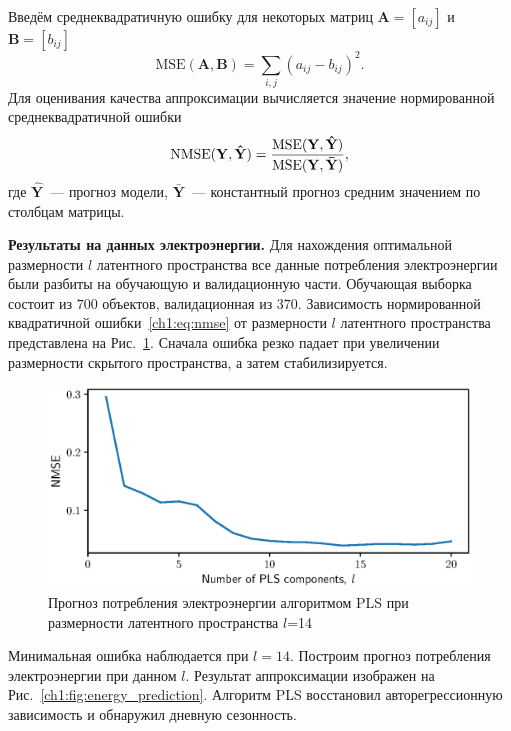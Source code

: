 Введём среднеквадратичную ошибку для некоторых матриц $\mathbf{A} = [a_{ij}]$ и $\mathbf{B} = [b_{ij}]$
\[
\text{MSE} (\mathbf{A}, \mathbf{B}) = \sum_{i,j} (a_{ij} - b_{ij})^2.
\]
Для оценивания качества аппроксимации вычисляется значение нормированной среднеквадратичной ошибки
\begin{equation}
\text{NMSE}(\mathbf{Y},  \mathbf{\hat{Y}}) = \frac{\text{MSE} (\mathbf{Y}, \mathbf{\hat{Y}})}{\text{MSE} (\mathbf{Y}, \mathbf{\bar{Y}})},
\label{ch1:eq:nmse}
\end{equation}
где $\mathbf{\hat{Y}}$~--- прогноз модели, $\mathbf{\bar{Y}}$~--- константный прогноз средним значением по столбцам матрицы.

\textbf{Результаты на данных электроэнергии.}
Для нахождения оптимальной размерности $l$ латентного пространства все данные потребления электроэнергии были разбиты на обучающую и валидационную части. 
Обучающая выборка состоит из $700$ объектов, валидационная из $370$. Зависимость нормированной квадратичной ошибки~\eqref{ch1:eq:nmse} от размерности $l$ латентного пространства представлена на Рис.~\ref{ch1:fig:energy_n_comp}. 
Сначала ошибка резко падает при увеличении размерности скрытого пространства, а затем стабилизируется.

\begin{figure}[ht]
	\centering
	\includegraphics[width=0.75\linewidth]{figs/ch1/energy_n_comp}
	\caption{Прогноз потребления электроэнергии алгоритмом PLS при размерности латентного пространства $l$=14}
	\label{ch1:fig:energy_n_comp}
\end{figure}

Минимальная ошибка наблюдается при $l=14$. 
Построим прогноз потребления электроэнергии при данном $l$. 
Результат аппроксимации изображен на Рис.~\ref{ch1:fig:energy_prediction}. Алгоритм PLS восстановил авторегрессионную зависимость и обнаружил дневную сезонность.

